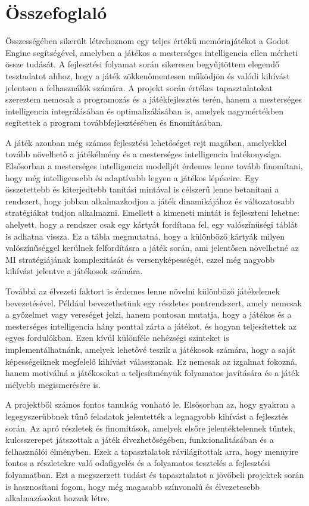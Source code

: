 \chapter{Összefoglaló}

\thispagestyle{fancy}
\pagestyle{fancy}
Összességében sikerült létrehoznom egy teljes értékű memóriajátékot a Godot Engine segítségével, amelyben a játékos a mesterséges intelligencia ellen mérheti össze tudását. A fejlesztési folyamat során sikeresen begyűjtöttem elegendő tesztadatot ahhoz, hogy a játék zökkenőmentesen működjön és valódi kihívást jelentsen a felhasználók számára. A projekt során értékes tapasztalatokat szereztem nemcsak a programozás és a játékfejlesztés terén, hanem a mesterséges intelligencia integrálásában és optimalizálásában is, amelyek nagymértékben segítettek a program továbbfejlesztésében és finomításában.

A játék azonban még számos fejlesztési lehetőséget rejt magában, amelyekkel tovább növelhető a játékélmény és a mesterséges intelligencia hatékonysága. Elsősorban a mesterséges intelligencia modelljét érdemes lenne tovább finomítani, hogy még intelligensebb és adaptívabb legyen a játékos lépéseire. Egy összetettebb és kiterjedtebb tanítási mintával is célszerű lenne betanítani a rendszert, hogy jobban alkalmazkodjon a játék dinamikájához és változatosabb stratégiákat tudjon alkalmazni. Emellett a kimeneti mintát is fejleszteni lehetne: ahelyett, hogy a rendszer csak egy kártyát fordítana fel, egy valószínűségi táblát is adhatna vissza. Ez a tábla megmutatná, hogy a különböző kártyák milyen valószínűséggel kerülnek felfordításra a játék során, ami jelentősen növelhetné az MI stratégiájának komplexitását és versenyképességét, ezzel még nagyobb kihívást jelentve a játékosok számára.

Továbbá az élvezeti faktort is érdemes lenne növelni különböző játékelemek bevezetésével. Például bevezethetünk egy részletes pontrendszert, amely nemcsak a győzelmet vagy vereséget jelzi, hanem pontosan mutatja, hogy a játékos és a mesterséges intelligencia hány ponttal zárta a játékot, és hogyan teljesítettek az egyes fordulókban. Ezen kívül különféle nehézségi szinteket is implementálhatnánk, amelyek lehetővé teszik a játékosok számára, hogy a saját képességeiknek megfelelő kihívást válasszanak. Ez nemcsak az izgalmat fokozná, hanem motiválná a játékosokat a teljesítményük folyamatos javítására és a játék mélyebb megismerésére is.

A projektből számos fontos tanulság vonható le. Elsősorban az, hogy gyakran a legegyszerűbbnek tűnő feladatok jelentették a legnagyobb kihívást a fejlesztés során. Az apró részletek és finomítások, amelyek elsőre jelentéktelennek tűntek, kulcsszerepet játszottak a játék élvezhetőségében, funkcionalitásában és a felhasználói élményben. Ezek a tapasztalatok rávilágítottak arra, hogy mennyire fontos a részletekre való odafigyelés és a folyamatos tesztelés a fejlesztési folyamatban. Ezt a megszerzett tudást és tapasztalatot a jövőbeli projektek során is hasznosítani fogom, hogy még magasabb színvonalú és élvezetesebb alkalmazásokat hozzak létre.